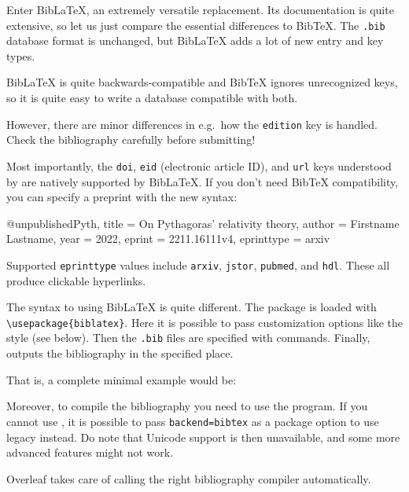 Enter BibLaTeX, an extremely versatile replacement.
Its documentation \cite{biblatex} is quite extensive,
so let us just compare the essential differences to BibTeX.
The \verb|.bib| database format is unchanged,
but BibLaTeX adds a lot of new entry and key types.

\begin{gotcha}
BibLaTeX is quite backwards-compatible and BibTeX ignores unrecognized keys,
so it is quite easy to write a database compatible with both.

However, there are minor differences in e.g.\ how the \verb|edition| key is handled.
Check the bibliography carefully before submitting!
\end{gotcha}

Most importantly, the \verb|doi|, \verb|eid| (electronic article ID), and \verb|url| keys
understood by  are natively supported by BibLaTeX.
If you don't need BibTeX compatibility,
you can specify a preprint with the new syntax:
\begin{ExampleCode}
@unpublished{Pyth,
    title = {On {Pythagoras'} relativity theory},
    author = {Firstname Lastname},
    year = {2022},
    eprint = {2211.16111v4},
    eprinttype = {arxiv}
}
\end{ExampleCode}
%
Supported \verb|eprinttype| values include \verb|arxiv|, \verb|jstor|, \verb|pubmed|, and \verb|hdl|.
These all produce clickable hyperlinks.

The syntax to using BibLaTeX is quite different.
The package is loaded with \verb|\usepackage{biblatex}|.
Here it is possible to pass customization options like the style (see below).
Then the \verb|.bib| files are specified with  commands.
Finally,  outputs the bibliography in the specified place.

That is, a complete minimal example would be:
\begin{ExampleCode}
\usepackage{biblatex}


\printbibliography
\end{ExampleCode}

Moreover, to compile the bibliography you need to use the  program.
If you cannot use , it is possible to pass \verb|backend=bibtex|
as a package option to use legacy  instead.
Do note that Unicode support is then unavailable,
and some more advanced features might not work.

\begin{overleaf}
Overleaf takes care of calling the right bibliography compiler automatically.
\end{overleaf}

